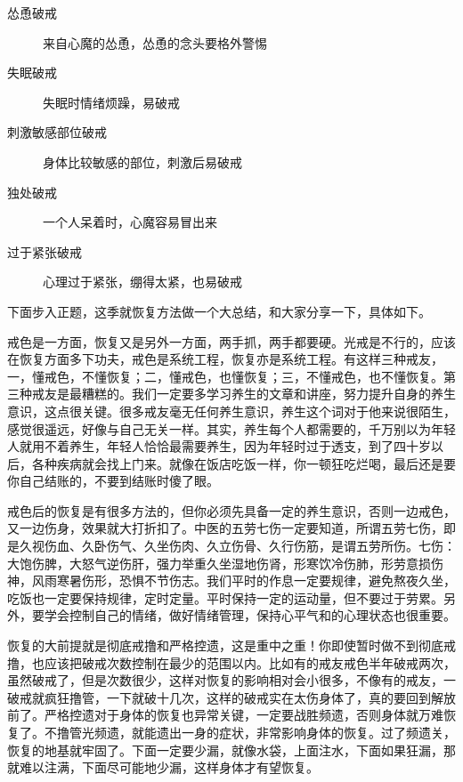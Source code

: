 \begin{adjustwidth}{-5em}{-5em}
\begin{multicols}{2}
\begin{description}
            \item[怂恿破戒] 来自心魔的怂恿，怂恿的念头要格外警惕
            \item[失眠破戒] 失眠时情绪烦躁，易破戒
            \item[刺激敏感部位破戒] 身体比较敏感的部位，刺激后易破戒
            \item[独处破戒] 一个人呆着时，心魔容易冒出来
            \item[过于紧张破戒] 心理过于紧张，绷得太紧，也易破戒
        \end{description}
    \end{multicols}
\end{adjustwidth}

下面步入正题，这季就恢复方法做一个大总结，和大家分享一下，具体如下。

戒色是一方面，恢复又是另外一方面，两手抓，两手都要硬。光戒是不行的，应该在恢复方面多下功夫，戒色是系统工程，恢复亦是系统工程。有这样三种戒友，一，懂戒色，不懂恢复；二，懂戒色，也懂恢复；三，不懂戒色，也不懂恢复。第三种戒友是最糟糕的。我们一定要多学习养生的文章和讲座，努力提升自身的养生意识，这点很关键。很多戒友毫无任何养生意识，养生这个词对于他来说很陌生，感觉很遥远，好像与自己无关一样。其实，养生每个人都需要的，千万别以为年轻人就用不着养生，年轻人恰恰最需要养生，因为年轻时过于透支，到了四十岁以后，各种疾病就会找上门来。就像在饭店吃饭一样，你一顿狂吃烂喝，最后还是要你自己结账的，不要到结账时傻了眼。

戒色后的恢复是有很多方法的，但你必须先具备一定的养生意识，否则一边戒色，又一边伤身，效果就大打折扣了。中医的五劳七伤一定要知道，所谓五劳七伤，即是久视伤血、久卧伤气、久坐伤肉、久立伤骨、久行伤筋，是谓五劳所伤。七伤：大饱伤脾，大怒气逆伤肝，强力举重久坐湿地伤肾，形寒饮冷伤肺，形劳意损伤神，风雨寒暑伤形，恐惧不节伤志。我们平时的作息一定要规律，避免熬夜久坐，吃饭也一定要保持规律，定时定量。平时保持一定的运动量，但不要过于劳累。另外，要学会控制自己的情绪，做好情绪管理，保持心平气和的心理状态也很重要。

恢复的大前提就是彻底戒撸和严格控遗，这是重中之重！你即使暂时做不到彻底戒撸，也应该把破戒次数控制在最少的范围以内。比如有的戒友戒色半年破戒两次，虽然破戒了，但是次数很少，这样对恢复的影响相对会小很多，不像有的戒友，一破戒就疯狂撸管，一下就破十几次，这样的破戒实在太伤身体了，真的要回到解放前了。严格控遗对于身体的恢复也异常关键，一定要战胜频遗，否则身体就万难恢复了。不撸管光频遗，就能遗出一身的症状，非常影响身体的恢复。过了频遗关，恢复的地基就牢固了。下面一定要少漏，就像水袋，上面注水，下面如果狂漏，那就难以注满，下面尽可能地少漏，这样身体才有望恢复。

